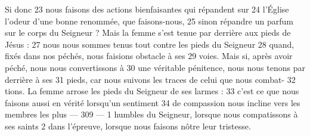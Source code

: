Si donc	 
23	 	nous faisons des actions bienfaisantes qui répandent sur	 
24	 	l'Église l'odeur d'une bonne renommée, que faisons-nous,	 
25	 	sinon répandre un parfum sur le corps du Seigneur ?
Mais la femme s'est tenue par derrière aux pieds de Jésus :	 
27	 	nous nous sommes tenus tout contre les pieds du Seigneur	 
28	 	quand, fixés dans nos péchés, nous faisions obstacle à ses	 
29	 	voies. Mais si, après avoir péché, nous nous convertissons à	 
30	 	une véritable pénitence, nous nous tenons par derrière à ses	 
31	 	pieds, car nous suivons les traces de celui que nous combat-	 
32	 	tions. La femme arrose les pieds du Seigneur de ses larmes :	 
33	 	c'est ce que nous faisons aussi en vérité lorsqu'un sentiment	 
34	 	de compassion nous incline vers les membres les plus	 
 	--- 309 ---	 
1	 	humbles du Seigneur, lorsque nous compatissons à ses saints	 
2	 	dans l'épreuve, lorsque nous faisons nôtre leur tristesse.